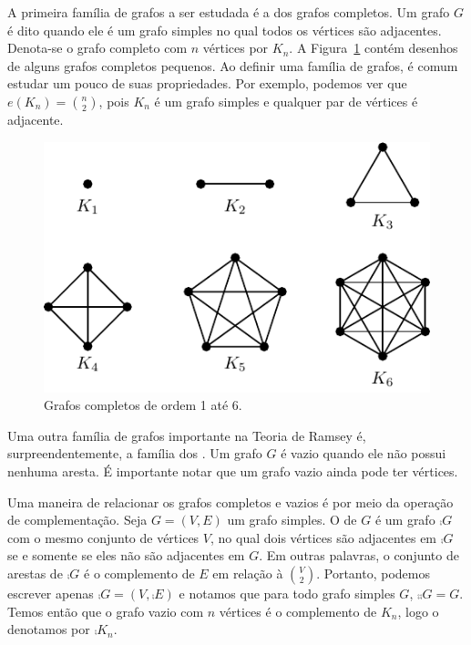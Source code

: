 A primeira família de grafos a ser estudada é a dos grafos completos. Um grafo $G$ é dito   quando ele é um grafo simples no qual todos os vértices são adjacentes. Denota-se o grafo completo com $n$ vértices por $K_n$. A Figura~\ref{fig:intro:complete} contém desenhos de alguns grafos completos pequenos. Ao definir uma família de grafos, é comum estudar um pouco de suas propriedades. Por exemplo, podemos ver que $e(K_n) = \binom{n}{2}$, pois $K_n$ é um grafo simples e qualquer par de vértices é adjacente.

\begin{figure}[ht!]
\centering
\includegraphics{figures/1_intro_3_complete}
\caption{Grafos completos de ordem 1 até 6.}
\label{fig:intro:complete}
\end{figure}

Uma outra família de grafos importante na Teoria de Ramsey é, surpreendentemente, a família dos . Um grafo $G$ é vazio quando ele não possui nenhuma aresta. É importante notar que um grafo vazio ainda pode ter vértices.

Uma maneira de relacionar os grafos completos e vazios é por meio da operação de complementação. Seja $G = (V,E)$ um grafo simples. O  de $G$ é um grafo $\comp{G}$ com o mesmo conjunto de vértices $V$, no qual dois vértices são adjacentes em $\comp{G}$ se e somente se eles não são adjacentes em $G$. Em outras palavras, o conjunto de arestas de $\comp{G}$ é o complemento de $E$ em relação à $\binom{V}{2}$. Portanto, podemos escrever apenas $\comp{G} = (V,\comp{E})$ e notamos que para todo grafo simples $G$, $\comp{\comp{G}} = G$.
Temos então que o grafo vazio com $n$ vértices é o complemento de $K_n$, logo o denotamos por $\comp{K_n}$.

